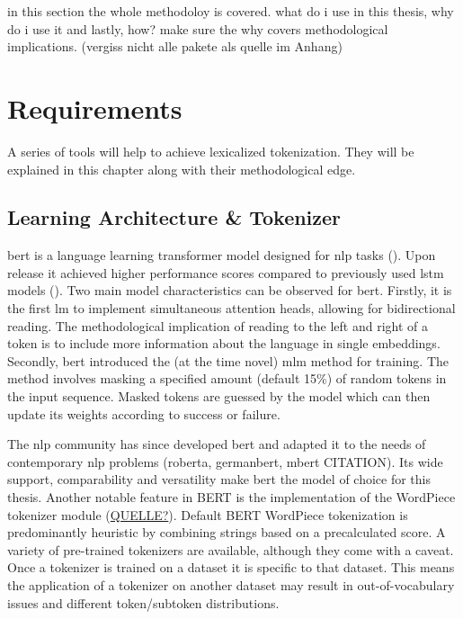 in this section the whole methodoloy is covered. what do i use in this thesis, why do i use it and lastly, how?
make sure the why covers methodological implications. (vergiss nicht alle pakete als quelle im Anhang)

\section{Requirements}
\label{sec:requirements}
A series of tools will help to achieve lexicalized tokenization.
They will be explained in this chapter along with their methodological edge.

\subsection{Learning Architecture \& Tokenizer}
\label{subsec:mlm}

\ac{bert} is a language learning transformer model designed for \ac{nlp} tasks (\cite{ATTENTION}).
Upon release it achieved higher performance scores compared to previously used \ac{lstm} models (\cite{BERTHIGH1}).
Two main model characteristics can be observed for \ac{bert}.
Firstly, it is the first \ac{lm} to implement simultaneous attention heads, allowing for bidirectional reading.
The methodological implication of reading to the left and right of a token is to include more information about the language in single embeddings.
Secondly, \ac{bert} introduced the (at the time novel) \ac{mlm} method for training.
The method involves masking a specified amount (default 15\%) of random tokens in the input sequence.
Masked tokens are guessed by the model which can then update its weights according to success or failure.

The \ac{nlp} community has since developed \ac{bert} and adapted it to the needs of contemporary \ac{nlp} problems (roberta, germanbert, mbert \uppercase{citation}).
Its wide support, comparability and versatility make \ac{bert} the model of choice for this thesis.
Another notable feature in \uppercase{bert} is the implementation of the WordPiece tokenizer module (\uppercase{\href{https://huggingface.co/course/chapter6/6?fw=pt}{quelle?}}).
Default BERT WordPiece tokenization is predominantly heuristic by combining strings based on a precalculated score.
A variety of pre-trained tokenizers are available, although they come with a caveat.
Once a tokenizer is trained on a dataset it is specific to that dataset.
This means the application of a tokenizer on another dataset may result in out-of-vocabulary issues and different token/subtoken distributions.

